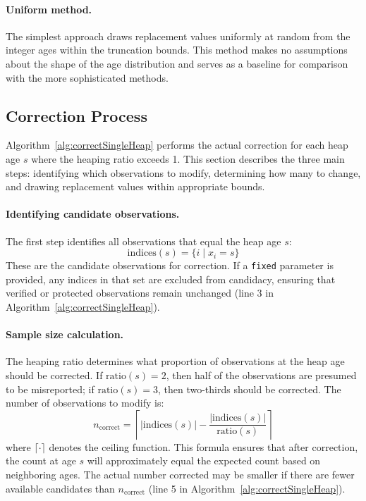 \documentclass[12pt]{article}
\theoremstyle{plain}
\theoremstyle{definition}
\begin{document}
\paragraph{Uniform method.} The simplest approach draws replacement values uniformly at random from the integer ages within the truncation bounds. This method makes no assumptions about the shape of the age distribution and serves as a baseline for comparison with the more sophisticated methods.

\subsection{Correction Process}\label{sec:correction}

Algorithm~\ref{alg:correctSingleHeap} performs the actual correction for each heap age $s$ where the heaping ratio exceeds 1. This section describes the three main steps: identifying which observations to modify, determining how many to change, and drawing replacement values within appropriate bounds.

\paragraph{Identifying candidate observations.}
The first step identifies all observations that equal the heap age $s$:
\[
\text{indices}(s) = \{i \mid x_i = s\}
\]
These are the candidate observations for correction. If a \texttt{fixed} parameter is provided, any indices in that set are excluded from candidacy, ensuring that verified or protected observations remain unchanged (line 3 in Algorithm~\ref{alg:correctSingleHeap}).

\paragraph{Sample size calculation.}
The heaping ratio determines what proportion of observations at the heap age should be corrected. If $\text{ratio}(s) = 2$, then half of the observations are presumed to be misreported; if $\text{ratio}(s) = 3$, then two-thirds should be corrected. The number of observations to modify is:
\[
n_{\text{correct}} = \left\lceil |\text{indices}(s)| - \frac{|\text{indices}(s)|}{\text{ratio}(s)} \right\rceil
\]
where $\lceil \cdot \rceil$ denotes the ceiling function. This formula ensures that after correction, the count at age $s$ will approximately equal the expected count based on neighboring ages. The actual number corrected may be smaller if there are fewer available candidates than $n_{\text{correct}}$ (line 5 in Algorithm~\ref{alg:correctSingleHeap}).
\end{document}
